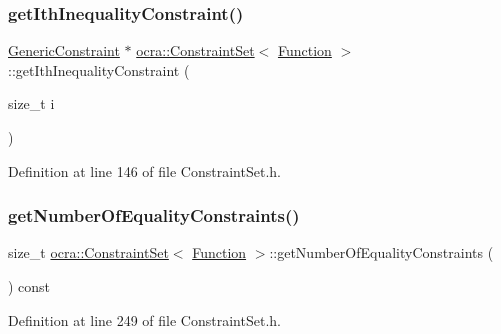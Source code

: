 \subsubsection{\texorpdfstring{get\+Ith\+Inequality\+Constraint()}{getIthInequalityConstraint()}}
{\footnotesize\ttfamily \hyperlink{namespaceocra_af10341108ce661566aad00908668e2b1}{Generic\+Constraint} $\ast$ \hyperlink{classocra_1_1ConstraintSet}{ocra\+::\+Constraint\+Set}$<$ \hyperlink{classocra_1_1Function}{Function} $>$\+::get\+Ith\+Inequality\+Constraint (\begin{DoxyParamCaption}\item[{size\+\_\+t}]{i }\end{DoxyParamCaption})\hspace{0.3cm}{\ttfamily [inline]}}



Definition at line 146 of file Constraint\+Set.\+h.

\hypertarget{classocra_1_1ConstraintSet_3_01Function_01_4_a0266bb038c16c77959135d447ace07bd}{}\label{classocra_1_1ConstraintSet_3_01Function_01_4_a0266bb038c16c77959135d447ace07bd} 
\subsubsection{\texorpdfstring{get\+Number\+Of\+Equality\+Constraints()}{getNumberOfEqualityConstraints()}}
{\footnotesize\ttfamily size\+\_\+t \hyperlink{classocra_1_1ConstraintSet}{ocra\+::\+Constraint\+Set}$<$ \hyperlink{classocra_1_1Function}{Function} $>$\+::get\+Number\+Of\+Equality\+Constraints (\begin{DoxyParamCaption}{ }\end{DoxyParamCaption}) const\hspace{0.3cm}{\ttfamily [inline]}}



Definition at line 249 of file Constraint\+Set.\+h.

\hypertarget{classocra_1_1ConstraintSet_3_01Function_01_4_a61cb359fca1d6cfce9b6ac3b551c7f85}{}\label{classocra_1_1ConstraintSet_3_01Function_01_4_a61cb359fca1d6cfce9b6ac3b551c7f85} 
